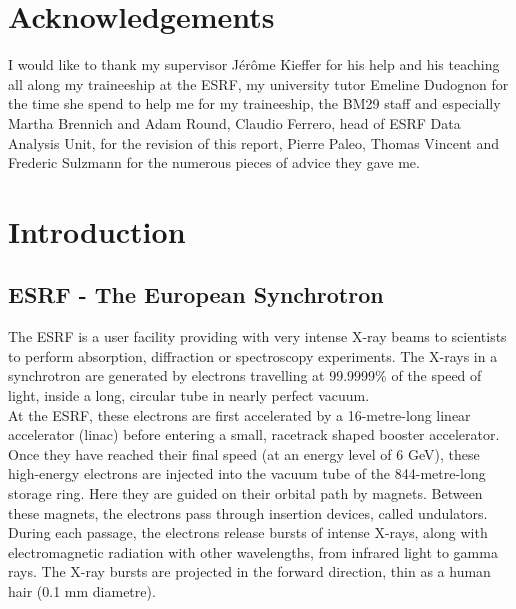 \documentclass[a4paper, 11pt]{report}
\begin{document}
\chapter*{Acknowledgements}

I would like to thank my supervisor J\'er\^ome Kieffer for his help 
and his teaching all along my traineeship at the ESRF, my university 
tutor Emeline Dudognon for the time she spend to help me for my 
traineeship, the BM29 staff and especially Martha Brennich and Adam 
Round, Claudio Ferrero, head of ESRF Data Analysis Unit, for the 
revision of this report, Pierre Paleo, Thomas Vincent and Frederic 
Sulzmann for the numerous pieces of advice they gave me.


\tableofcontents
{}


\chapter{Introduction}


\section{ESRF - The European Synchrotron}

The ESRF is a user facility providing with very intense X-ray beams to 
scientists to perform absorption, diffraction or spectroscopy 
experiments. 
The X-rays in a synchrotron are generated by electrons travelling at 
99.9999\% of the speed of light, inside a long, circular tube in nearly 
perfect vacuum.\\

At the ESRF, these electrons are first accelerated by a 16-metre-long 
linear accelerator (linac) before entering a small, racetrack shaped 
booster accelerator. 
Once they have reached their final speed (at an energy level of 6 GeV), 
these high-energy electrons are injected into the vacuum tube of the
844-metre-long storage ring.
Here they are guided on their orbital path by magnets. 
Between these magnets, the electrons pass through insertion 
devices, called undulators.
During each passage, the electrons release bursts of intense X-rays, 
along with electromagnetic radiation with other wavelengths, from 
infrared light to gamma rays. 
The X-ray bursts are projected in the forward direction, thin as a 
human hair (0.1 mm diametre).\\
\end{document}

